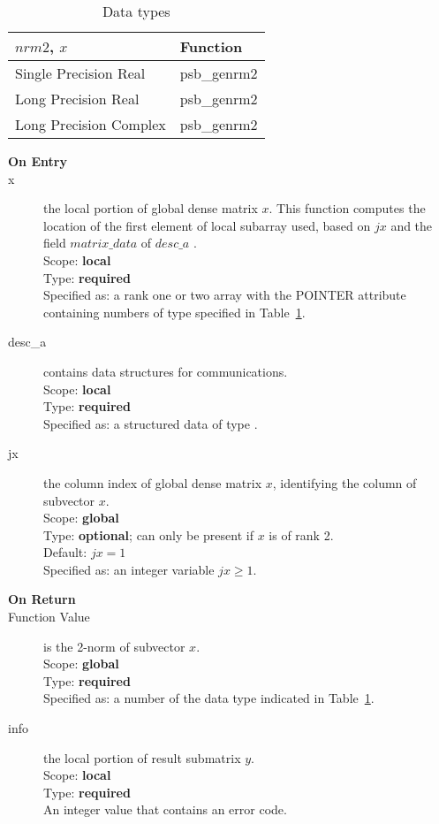 \begin{table}[h]
\begin{center}
\begin{tabular}{ll}
\hline
$nrm2$, $x$ & {\bf Function}\\
\hline
Single Precision Real & psb\_genrm2\\
Long Precision Real & psb\_genrm2 \\
Long Precision Complex & psb\_genrm2 \\
\hline
\end{tabular}
\end{center}
\caption{Data types\label{tab:f90nrm2}}
\end{table}

\begin{description}
\item[\bf On Entry]
\item[x] the local portion of global dense matrix
$x$. This function computes the location of the first element of
local subarray used, based on $jx$ and the field $matrix\_data$ of $desc\_a$ . \\
Scope: {\bf local} \\
Type: {\bf required} \\
Specified as:  a rank one or two array with the POINTER attribute
containing numbers of type specified in
Table~\ref{tab:f90nrm2}.
\item[desc\_a] contains data structures for communications.\\
Scope: {\bf local} \\
Type: {\bf required}\\
Specified as: a structured data of type \descdata.
\item[jx]  the column index of global dense matrix $x$,
identifying the column of subvector $x$.\\
Scope: {\bf global} \\
Type: {\bf optional}; can only be present if $x$ is of rank 2.\\	
Default: $jx = 1$\\	
Specified as: an integer variable $jx\ge 1$. 

\item[\bf On Return] 
\item[Function Value] is the 2-norm of subvector $x$.\\
Scope: {\bf global} \\
Type: {\bf required} \\
Specified as: a number of the data type indicated in Table~\ref{tab:f90nrm2}.
\item[info] the local portion of result submatrix $y$.\\
Scope: {\bf local} \\
Type: {\bf required} \\
An integer value that contains an error code. 
\end{description}

